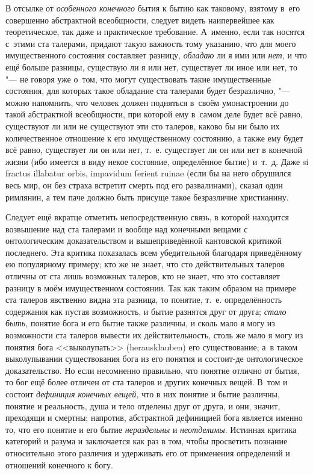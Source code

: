 В отсылке от {\em особенного конечного} бытия к бытию как таковому, взятому
в~его совершенно абстрактной всеобщности, следует видеть наипервейшее как
теоретическое, так даже и практическое требование. А~именно, если так носятся
с~этими ста талерами, придают такую важность тому указанию, что для моего
имущественного состояния составляет разницу, {\em обладаю} ли я ими или
{\em нет,} и что ещё больше разницы, существую ли я или нет, существует ли иное
или нет, то "--- не говоря уже о~том, что могут существовать такие
имущественные состояния, для которых такое обладание ста талерами будет
безразлично, "--- можно напомнить, что человек должен подняться в~своём
умонастроении до такой абстрактной всеобщности, при которой ему в~самом деле
будет всё равно, существуют ли или не существуют эти сто талеров, каково бы ни
было их количественное отношение к его имущественному состоянию, а также ему
будет всё равно, существует ли он или нет, т.~е. существует ли он или нет в
конечной жизни (ибо имеется в виду некое состояние, определённое бытие) и~т.~д.
Даже si fractus illabatur orbis, impavidum ferient ruinae (если бы на него
обрушился весь мир, он без страха встретит смерть под его развалинами), сказал
один римлянин, а тем паче должно быть присуще такое безразличие христианину.

Следует ещё вкратце отметить непосредственную связь, в которой находится
возвышение над ста талерами и вообще над конечными вещами с онтологическим
доказательством и вышеприведённой кантовской критикой последнего. Эта критика
показалась всем убедительной благодаря приведённому ею популярному примеру; кто
же не знает, что сто действительных талеров отличны от ста лишь возможных
талеров, кто не знает, что это составляет разницу в моём имущественном
состоянии. Так как таким образом на примере ста талеров явственно видна эта
разница, то понятие, т.~е. определённость содержания как пустая возможность, и
бытие разнятся друг от друга; {\em стало быть,} понятие бога и его бытие также
различны, и сколь мало я могу из возможности ста талеров вывести их
действительность, столь же мало я могу из понятия бога <<выколупать>>
(heraus\-klau\-ben) его существование; а~в таком выколупывании существования
бога из его понятия и состоит-де онтологическое доказательство. Но если
несомненно правильно, что понятие отлично от бытия, то бог ещё более
отличен от ста талеров и других конечных вещей. В~том и состоит
{\em дефиниция конечных вещей,} что в них понятие и бытие различны, понятие
и реальность, душа и тело отделены друг от друга, и они, значит, преходящи
и смертны; напротив, абстрактной дефиницией бога является именно то, что его
понятие и его бытие {\em нераздельны} и {\em неотделимы}. Истинная критика
категорий и разума и заключается как раз в том, чтобы просветить познание
относительно этого различия и удерживать его от применения определений и
отношений конечного к богу.\label{bkm:bm85b}

